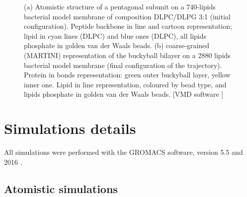 \begin{figure}[t]
\centering
{}
\caption[Snapshot of simulations of capzip on model membranes]{(a) Atomistic structure of a pentagonal subunit on a 740-lipids bacterial model membrane of composition DLPC/DLPG 3:1 (initial configuration). Peptide backbone in line and cartoon representation; lipid in cyan lines (DLPC) and blue ones (DLPC), all lipids phosphate in golden van der Waals beads. (b) coarse-grained (MARTINI) representation of the buckyball bilayer on a 2880 lipids bacterial model membrane (final configuration of the trajectory). Protein in bonds representation: green outer buckyball layer, yellow inner one. Lipid in line representation, coloured by bead type, and lipids phosphate in golden van der Waals beads. [VMD software \citet{HUMP96}]}
\label{fig:pL6_vmd}
\end{figure}


\section{Simulations details} \label{sec:details}

All simulations were performed with the GROMACS software, version 5.5 and 2016 \citep{Berendsen1995,Abraham2015,gromacs_man}. 

\subsection{Atomistic simulations}
